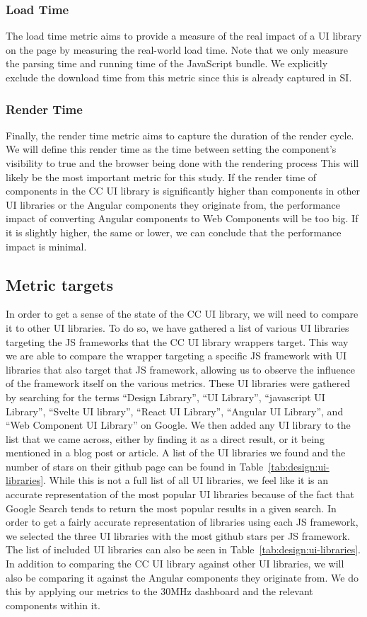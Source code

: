 \subsubsection{Load Time}
The load time metric aims to provide a measure of the real impact of a UI library on the page by measuring the real-world load time. Note that we only measure the parsing time and running time of the JavaScript bundle. We explicitly exclude the download time from this metric since this is already captured in SI\@.

\subsubsection{Render Time}
Finally, the render time metric aims to capture the duration of the render cycle. We will define this render time as the time between setting the component's visibility to true and the browser being done with the rendering process This will likely be the most important metric for this study. If the render time of components in the CC UI library is significantly higher than components in other UI libraries or the Angular components they originate from, the performance impact of converting Angular components to Web Components will be too big. If it is slightly higher, the same or lower, we can conclude that the performance impact is minimal.

\subsection{Metric targets}
In order to get a sense of the state of the CC UI library, we will need to compare it to other UI libraries. To do so, we have gathered a list of various UI libraries targeting the JS frameworks that the CC UI library wrappers target. This way we are able to compare the wrapper targeting a specific JS framework with UI libraries that also target that JS framework, allowing us to observe the influence of the framework itself on the various metrics. These UI libraries were gathered by searching for the terms ``Design Library'', ``UI Library'', ``javascript UI Library'', ``Svelte UI library'', ``React UI Library'', ``Angular UI Library'', and ``Web Component UI Library'' on Google. We then added any UI library to the list that we came across, either by finding it as a direct result, or it being mentioned in a blog post or article. A list of the UI libraries we found and the number of stars on their github page can be found in Table~\ref{tab:design:ui-libraries}. While this is not a full list of all UI libraries, we feel like it is an accurate representation of the most popular UI libraries because of the fact that Google Search tends to return the most popular results in a given search. In order to get a fairly accurate representation of libraries using each JS framework, we selected the three UI libraries with the most github stars per JS framework. The list of included UI libraries can also be seen in Table~\ref{tab:design:ui-libraries}. In addition to comparing the CC UI library against other UI libraries, we will also be comparing it against the Angular components they originate from. We do this by applying our metrics to the 30MHz dashboard and the relevant components within it.

